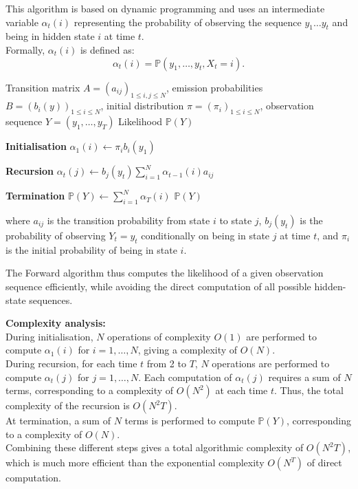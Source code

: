 \documentclass[11pt]{article}
\begin{document}
This algorithm is based on dynamic programming and uses an intermediate variable $\alpha_t(i)$ representing the probability of observing the sequence $y_1 \dots y_t$ and being in hidden state $i$ at time $t$.\\
Formally, $\alpha_t(i)$ is defined as: 
\[
\alpha_t(i) = \mathbb{P}(y_1, \dots, y_t, X_t = i).
\]

\vspace{0.5cm}
\begin{algorithm}[H]
\caption{Forward Algorithm}
\label{alg:forward}
\begin{algorithmic}[1]
\Require Transition matrix $A = (a_{ij})_{1 \leq i,j \leq N}$,
emission probabilities $B = (b_i(y))_{1 \leq i \leq N}$,
initial distribution $\pi = (\pi_i)_{1 \leq i \leq N}$,
observation sequence $Y = (y_1,\dots,y_T)$
\Ensure Likelihood $\mathbb{P}(Y)$

\Statex
\Statex \textbf{Initialisation}
    \State $\alpha_1(i) \gets \pi_i b_i(y_1)$
\EndFor

\Statex
\Statex \textbf{Recursion}
        \State $\displaystyle \alpha_t(j) \gets b_j(y_t)
        \sum_{i=1}^N \alpha_{t-1}(i)a_{ij}$
    \EndFor
\EndFor

\Statex
\Statex \textbf{Termination}
\State $\displaystyle \mathbb{P}(Y) \gets \sum_{i=1}^N \alpha_T(i)$
\State \Return $\mathbb{P}(Y)$

\end{algorithmic}
\end{algorithm}

where $a_{ij}$ is the transition probability from state $i$ to state $j$, $b_j(y_{t})$ is the probability of observing $Y_t = y_t$ conditionally on being in state $j$ at time $t$, and $\pi_i$ is the initial probability of being in state $i$.

The Forward algorithm thus computes the likelihood of a given observation sequence efficiently, while avoiding the direct computation of all possible hidden-state sequences.
\vspace{0.5cm}

\textbf{Complexity analysis:}\\
During initialisation, $N$ operations of complexity $O(1)$ are performed to compute $\alpha_1(i)$ for $i=1, \dots, N$, giving a complexity of $O(N)$.\\
During recursion, for each time $t$ from 2 to $T$, $N$ operations are performed to compute $\alpha_t(j)$ for $j=1, \dots, N$. Each computation of $\alpha_t(j)$ requires a sum of $N$ terms, corresponding to a complexity of $O(N^2)$ at each time $t$. Thus, the total complexity of the recursion is $O(N^2T)$.\\
At termination, a sum of $N$ terms is performed to compute $\mathbb{P}(Y)$, corresponding to a complexity of $O(N)$.\\
Combining these different steps gives a total algorithmic complexity of $O(N^2T)$, which is much more efficient than the exponential complexity $O(N^T)$ of direct computation. 
\end{document}
